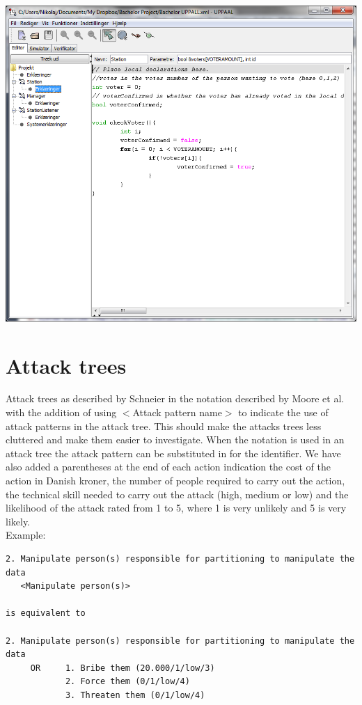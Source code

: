 \documentclass[a4paper]{report}
\begin{document}
\begin{center}
\includegraphics[width=\textwidth]{UPPAAL8.png}
\end{center}

\clearpage

\section{Attack trees}
Attack trees as described by Schneier in the notation described by Moore et al. with the addition of using $<$Attack pattern name$>$ to indicate the use of attack patterns in the attack tree. This should make the attacks trees less cluttered and make them easier to investigate. When the notation is used in an attack tree the attack pattern can be substituted in for the identifier.
We have also added a parentheses at the end of each action indication the cost of the action in Danish kroner, the number of people required to carry out the action, the technical skill needed to carry out the attack (high, medium or low) and the likelihood of the attack rated from 1 to 5, where 1 is very unlikely and 5 is very likely.\\

\noindent Example:
\begin{verbatim}
2. Manipulate person(s) responsible for partitioning to manipulate the data
   <Manipulate person(s)>
	
is equivalent to

2. Manipulate person(s) responsible for partitioning to manipulate the data
     OR     1. Bribe them (20.000/1/low/3)
            2. Force them (0/1/low/4)
            3. Threaten them (0/1/low/4)
\end{verbatim}
\end{document}

